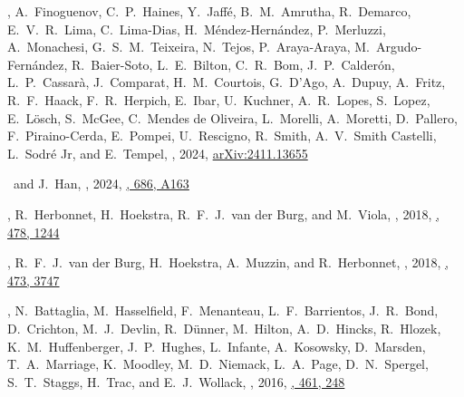 
\item
\myself, A.~Finoguenov, C.~P.~Haines, Y.~Jaffé, B.~M.~Amrutha, R.~Demarco, E.~V.~R.~Lima, C.~Lima-Dias, H.~Méndez-Hernández, P.~Merluzzi, A.~Monachesi, G.~S.~M.~Teixeira, N.~Tejos, P.~Araya-Araya, M.~Argudo-Fernández, R.~Baier-Soto, L.~E.~Bilton, C.~R.~Bom, J.~P.~Calderón, L.~P.~Cassarà, J.~Comparat, H.~M.~Courtois, G.~D'Ago, A.~Dupuy, A.~Fritz, R.~F.~Haack, F.~R.~Herpich, E.~Ibar, U.~Kuchner, A.~R.~Lopes, S.~Lopez, E.~Lösch, S.~McGee, C.~Mendes de Oliveira, L.~Morelli, A.~Moretti, D.~Pallero, F.~Piraino-Cerda, E.~Pompei, U.~Rescigno, R.~Smith, A.~V.~Smith Castelli, L.~Sodré Jr, and E.~Tempel,
,
2024, \href{https://ui.adsabs.harvard.edu/abs/2024arXiv241113655S}{arXiv:2411.13655}
\accepted{\aap}

\item
\myself\ and J.~Han,
,
2024, \href{https://ui.adsabs.harvard.edu/abs/2024A&A...686A.163S}{\aap, 686, A163}

\item
\myself, R.~Herbonnet, H.~Hoekstra, R.~F.~J.~van der Burg, and M.~Viola,
,
2018, \href{https://ui.adsabs.harvard.edu/abs/2018MNRAS.478.1244S}{\mnras, 478, 1244}

\item
\myself, R.~F.~J.~van der Burg, H.~Hoekstra, A.~Muzzin, and R.~Herbonnet,
,
2018, \href{https://ui.adsabs.harvard.edu/abs/2018MNRAS.473.3747S}{\mnras, 473, 3747}

\item
\myself, N.~Battaglia, M.~Hasselfield, F.~Menanteau, L.~F.~Barrientos, J.~R.~Bond, D.~Crichton, M.~J.~Devlin, R.~Dünner, M.~Hilton, A.~D.~Hincks, R.~Hlozek, K.~M.~Huffenberger, J.~P.~Hughes, L.~Infante, A.~Kosowsky, D.~Marsden, T.~A.~Marriage, K.~Moodley, M.~D.~Niemack, L.~A.~Page, D.~N.~Spergel, S.~T.~Staggs, H.~Trac, and E.~J.~Wollack,
,
2016, \href{https://ui.adsabs.harvard.edu/abs/2016MNRAS.461..248S}{\mnras, 461, 248}

